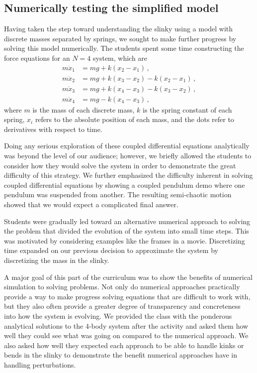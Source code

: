 \documentclass[aps,pre,10pt,superscriptaddress,showpacs,amsmath,amssymb,nofootinbib]{revtex4-1}
\newcommand{\nn}{\nonumber}
\begin{document}
\subsection{Numerically testing the simplified model}
\label{subsec:forcesnumeric}
Having taken the step toward understanding the slinky using a model with
discrete masses separated by springs, we sought to make further progress by
solving this model numerically. The students spent some time constructing the
force equations for an $N=4$ system, which are
\begin{align} \label{eq:coupleddes}
m\ddot{x}_1 &= mg + k(x_2 - x_1)\,,
\nn\\
m\ddot{x}_2 &= mg + k(x_3 - x_2) - k(x_2 - x_1)
\,,\nn\\
m\ddot{x}_3 &= mg + k(x_4 - x_3) - k(x_3 - x_2)
\,,\nn\\
m\ddot{x}_4 &= mg                - k(x_4 - x_3)
\,,\end{align}
where $m$ is the mass of each discrete mass, $k$ is the spring constant of each
spring, $x_i$ refers to the absolute position of each mass, and the dots refer to
derivatives with respect to time.

Doing any serious exploration of these coupled differential equations
analytically was beyond the level of our audience; however, we briefly allowed
the students to consider how they would solve the system in order to demonstrate
the great difficulty of this strategy. We further emphasized the difficulty inherent in
solving coupled differential equations by showing a coupled pendulum demo where
one pendulum was suspended from another. The resulting semi-chaotic motion
showed that we would expect a complicated final answer.

Students were gradually led toward an alternative numerical approach to solving
the problem that divided the evolution of the system into small time
steps. This was motivated by considering examples like the frames in a
movie. Discretizing time expanded on our previous decision to approximate the
system by discretizing the mass in the slinky.

A major goal of this part of the curriculum was to show the benefits of
numerical simulation to solving problems. Not only do numerical approaches
practically provide a way to make progress solving equations that are difficult
to work with, but they also often provide a greater degree of transparency and
concreteness into how the system is evolving. We provided the class with the
ponderous analytical solutions to the 4-body system after the activity and asked
them how well they could see what was going on compared to the numerical
approach. We also asked how well they expected each approach to be able to
handle kinks or bends in the slinky to demonstrate the benefit numerical
approaches have in handling perturbations.
\end{document}

